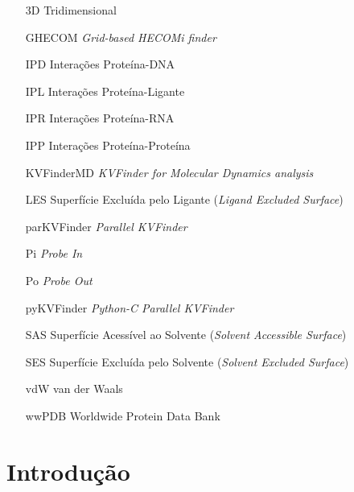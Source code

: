 \documentclass[Portugues]{phdquali}
\begin{document}
\listoffigures
\clearpage

\listoftables
\clearpage


\begin{itemize}
  \item[3D] Tridimensional
  \item[GHECOM] \textit{Grid-based HECOMi finder}
  \item[IPD] Interações Proteína-DNA
  \item[IPL] Interações Proteína-Ligante
  \item[IPR] Interações Proteína-RNA
  \item[IPP] Interações Proteína-Proteína
  \item[KVFinderMD] \textit{KVFinder for Molecular Dynamics analysis}
  \item[LES] Superfície Excluída pelo Ligante (\textit{Ligand Excluded Surface})
  \item[parKVFinder] \textit{Parallel KVFinder}
  \item[Pi] \textit{Probe In}
  \item[Po] \textit{Probe Out}
  \item[pyKVFinder] \textit{Python-C Parallel KVFinder}
  \item[SAS] Superfície Acessível ao Solvente (\textit{Solvent Accessible Surface})
  \item[SES] Superfície Excluída pelo Solvente (\textit{Solvent Excluded Surface})
  \item[vdW] van der Waals
  \item[wwPDB] Worldwide Protein Data Bank
\end{itemize}

\clearpage




\tableofcontents


\fimdaspaginasiniciais



\chapter{Introdução}
\end{document}
